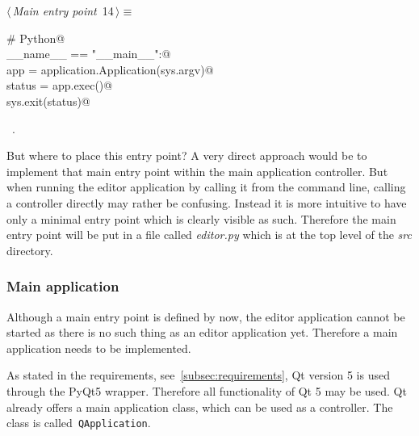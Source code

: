 \documentclass[
    a4paper,      %
    10pt,         %
    openright,    %
    notitlepage,  %
    parskip=half, %
]{scrreprt}       %
\theoremstyle{definition}                    %
\begin{document}
\begin{flushleft} \small
\begin{minipage}{\linewidth}\label{scrap1}\raggedright\small
{} $\langle\,${\itshape Main entry point}\nobreak\ {\footnotesize {14}}$\,\rangle\equiv$
\vspace{-1exm}
\begin{list}{}{} \item
\mbox{}\lstinline@# Python@\\
\mbox{}\lstinline@if __name__ == "__main__":@\\
\mbox{}\lstinline@    app = application.Application(sys.argv)@\\
\mbox{}\lstinline@    status = app.exec()@\\
\mbox{}\lstinline@    sys.exit(status)@\\
\mbox{}\lstinline@@{\NWsep}
\end{list}
\vspace{-1.5ex}
\footnotesize
\begin{list}{}{\setlength{\itemsep}{-\parsep}\setlength{\itemindent}{-\leftmargin}}
\item \NWtxtMacroRefIn\ .

\item{}
\end{list}
\end{minipage}\vspace{4ex}
\end{flushleft}
But where to place this entry point? A very direct approach would be to
implement that main entry point within the main application controller. But when
running the editor application by calling it from the command line, calling a
controller directly may rather be confusing. Instead it is more intuitive to
have only a minimal entry point which is clearly visible as such. Therefore the
main entry point will be put in a file called \textit{editor.py} which is at the
top level of the \textit{src} directory.

\subsubsection{Main application}
\label{ssubsec:main-application}

Although a main entry point is defined by now, the editor application cannot be
started as there is no such thing as an editor application yet. Therefore a main
application needs to be implemented.

As stated in the requirements, see~\autoref{subsec:requirements}, Qt version 5
is used through the PyQt5 wrapper. Therefore all functionality of Qt 5 may be
used. Qt already offers a main application class, which can be used as a
controller. The class is called~\verb+QApplication+.
\end{document}
